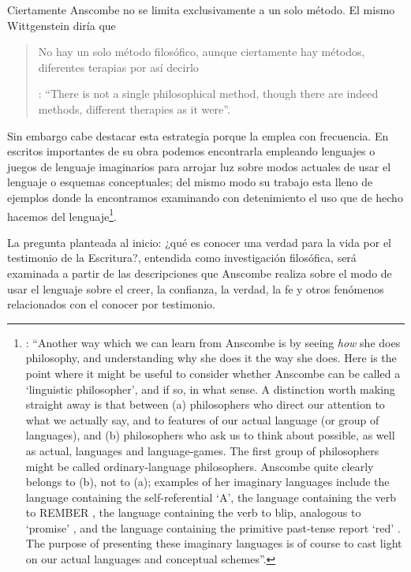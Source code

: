 Ciertamente Anscombe no se limita exclusivamente a un solo método. El mismo Wittgenstein diría que \blockquote[{\Cite[\S133]{wittgenstein1953phiinv}}: \enquote{There is not a single philosophical method, though there are indeed methods, different therapies as it were}.]{No hay un solo método filosófico, aunque ciertamente hay métodos, diferentes terapias por así decirlo}. Sin embargo cabe destacar esta estrategia porque la emplea con frecuencia. En escritos importantes de su obra podemos encontrarla empleando lenguajes o juegos de lenguaje imaginarios para arrojar luz sobre modos actuales de usar el lenguaje o esquemas conceptuales; del mismo modo su trabajo esta lleno de ejemplos donde la encontramos examinando con detenimiento el uso que de hecho hacemos del lenguaje\footnote{\Cite[Cf.][228-229]{teichmann2008ans}: \enquote{Another way which we can learn from Anscombe is by seeing \emph{how} she does philosophy, and understanding why she does it the way she does. Here is the point where it might be useful to consider whether Anscombe can be called a `linguistic philosopher', and if so, in what sense. A distinction worth making straight away is that between (a) philosophers who direct our attention to what we actually say, and to features of our actual language (or group of languages), and (b) philosophers who ask us to think about possible, as well as actual, languages and language-games. The first group of philosophers might be called ordinary-language philosophers. Anscombe quite clearly belongs to (b), not to (a); examples of her imaginary languages include the language containing the self-referential `A', the language containing the verb to REMBER \textelp{}, the language containing the verb to blip, analogous to `promise' \textelp{}, and the language containing the primitive past-tense report `red' \textelp{}. The purpose of presenting these imaginary languages is of course to cast light on our actual languages and conceptual schemes}.}.

La pregunta planteada al inicio: ¿qué es conocer una verdad para la vida por el testimonio de la Escritura?, entendida como investigación filosófica, será examinada a partir de las descripciones que Anscombe realiza sobre el modo de usar el lenguaje sobre el creer, la confianza, la verdad, la fe y otros fenómenos relacionados con el conocer por testimonio.

